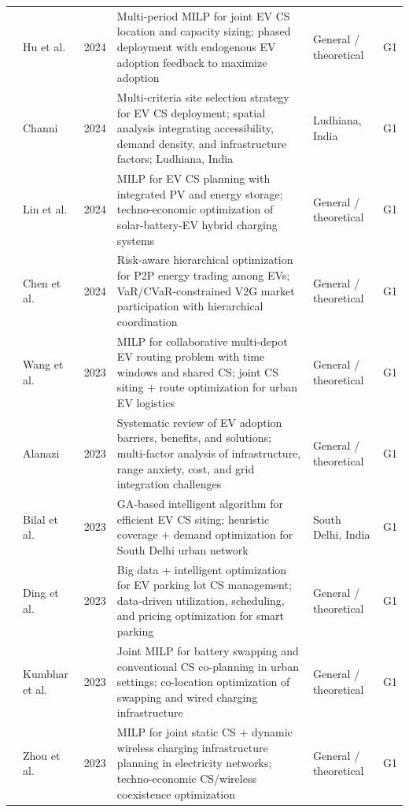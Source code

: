 \documentclass[letterpaper, 12pt, oneside, doublespacing]{Thesis}
\begin{document}
\begin{longtable}{L{0.9cm} L{2.2cm} L{0.8cm} L{3.3cm} L{2.5cm} L{1.5cm}}
\cite{locating_and_2024} & Hu et al. & 2024 & Multi-period MILP for joint EV CS location and capacity sizing; phased deployment with endogenous EV adoption feedback to maximize adoption & General {\slash} theoretical & G1 \\
\cite{optimizing_electric_2024} & Channi & 2024 & Multi-criteria site selection strategy for EV CS deployment; spatial analysis integrating accessibility, demand density, and infrastructure factors; Ludhiana, India & Ludhiana, India & G1 \\
\cite{planning_of_2024} & Lin et al. & 2024 & MILP for EV CS planning with integrated PV and energy storage; techno-economic optimization of solar-battery-EV hybrid charging systems & General {\slash} theoretical & G1 \\
\cite{risk-aware_hierarchical_2024} & Chen et al. & 2024 & Risk-aware hierarchical optimization for P2P energy trading among EVs; VaR/CVaR-constrained V2G market participation with hierarchical coordination & General {\slash} theoretical & G1 \\
\cite{collaborative_multidepot_2023} & Wang et al. & 2023 & MILP for collaborative multi-depot EV routing problem with time windows and shared CS; joint CS siting + route optimization for urban EV logistics & General {\slash} theoretical & G1 \\
\cite{electric_vehicles_2023} & Alanazi & 2023 & Systematic review of EV adoption barriers, benefits, and solutions; multi-factor analysis of infrastructure, range anxiety, cost, and grid integration challenges & General {\slash} theoretical & G1 \\
\cite{intelligent_algorithm-based_2023} & Bilal et al. & 2023 & GA-based intelligent algorithm for efficient EV CS siting; heuristic coverage + demand optimization for South Delhi urban network & South Delhi, India & G1 \\
\cite{optimal_management_2023} & Ding et al. & 2023 & Big data + intelligent optimization for EV parking lot CS management; data-driven utilization, scheduling, and pricing optimization for smart parking & General {\slash} theoretical & G1 \\
\cite{optimal_planning_2023} & Kumbhar et al. & 2023 & Joint MILP for battery swapping and conventional CS co-planning in urban settings; co-location optimization of swapping and wired charging infrastructure & General {\slash} theoretical & G1 \\
\cite{planning_of_2023} & Zhou et al. & 2023 & MILP for joint static CS + dynamic wireless charging infrastructure planning in electricity networks; techno-economic CS/wireless coexistence optimization & General {\slash} theoretical & G1 \\

\end{longtable}
\end{document}
